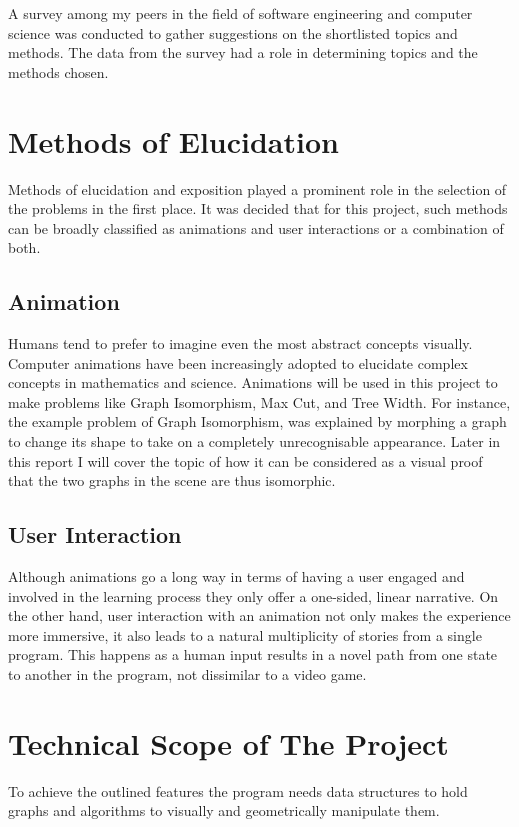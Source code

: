 A survey among my
peers in the field of software engineering and computer science was conducted to 
gather suggestions on the shortlisted topics and methods.
The data from the survey had a role in determining topics and the methods chosen.


\section{Methods of Elucidation}
Methods of elucidation and exposition played a prominent role in the selection of the problems
in the first place. It was decided that for this project, such methods can be
broadly classified as animations and user interactions or a combination of
both.


\subsection{Animation}

Humans tend to prefer to imagine even the most abstract concepts visually.
Computer animations have been increasingly adopted to elucidate complex
concepts in mathematics and science.  Animations will be used in this project to
make problems like Graph Isomorphism, Max Cut, and Tree Width.  For instance,
the example problem of Graph Isomorphism, was explained by morphing a graph to
change its shape to take on a completely unrecognisable appearance. Later in this report I will cover the topic of how it can be considered as a visual proof that the two graphs
in the scene are thus isomorphic.

\subsection{User Interaction}
Although animations go a long way in terms of having a user engaged and involved in
the learning process they only offer a one-sided, linear narrative. On the other hand,
user interaction with an animation not only makes the experience more
immersive, it also leads to a natural multiplicity of stories from a single
program. This happens as a human input results in a novel path from one state
to another in the program, not dissimilar to a video game.

\section{Technical Scope of The Project}
\label{requirements: techScope}

To achieve the outlined features the program needs data structures to hold
graphs and algorithms to visually and geometrically manipulate them. 

